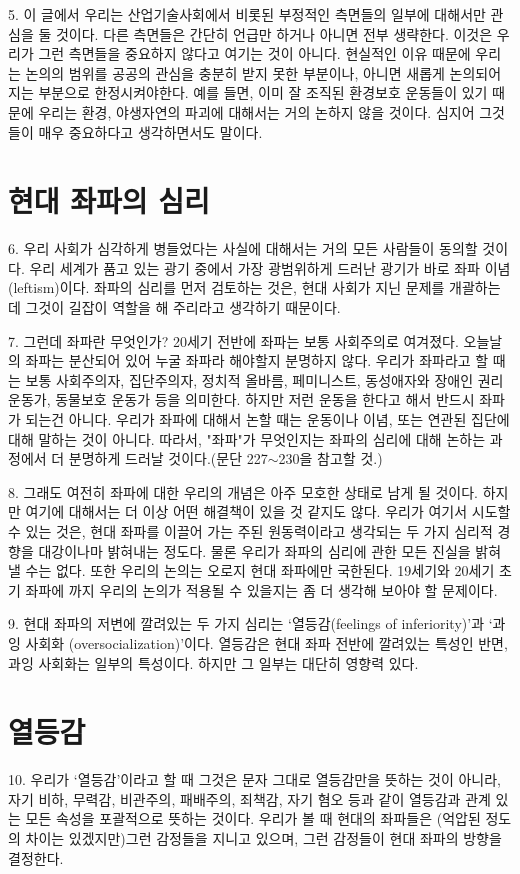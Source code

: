 \documentclass[11pt,a4paper]{article}
\begin{document}
\begin{multicols}{2}
5. 이 글에서 우리는 산업기술사회에서 비롯된 부정적인 측면들의 일부에 대해서만 관심을 둘 것이다.  다른 측면들은 간단히 언급만 하거나 아니면 전부 생략한다. 이것은 우리가 그런 측면들을 중요하지  않다고 여기는 것이 아니다. 현실적인 이유 때문에 우리는 논의의 범위를 공공의 관심을 충분히 받지 못한 부분이나, 아니면 새롭게 논의되어지는 부분으로 한정시켜야한다. 예를 들면, 이미 잘 조직된 환경보호 운동들이 있기 때문에 우리는 환경, 야생자연의 파괴에 대해서는 거의 논하지 않을 것이다. 심지어 그것들이 매우 중요하다고 생각하면서도 말이다. 


\section*{현대 좌파의 심리} 
6. 우리 사회가 심각하게 병들었다는 사실에 대해서는 거의 모든 사람들이 동의할 것이다. 우리 세계가  품고 있는 광기 중에서 가장 광범위하게 드러난 광기가 바로 좌파 이념(leftism)이다. 좌파의 심리를 먼저  검토하는 것은, 현대 사회가 지닌 문제를 개괄하는데 그것이 길잡이 역할을 해 주리라고 생각하기  때문이다.


7. 그런데 좌파란 무엇인가? 20세기 전반에 좌파는 보통 사회주의로 여겨졌다. 오늘날의 좌파는  분산되어 있어 누굴 좌파라 해야할지 분명하지 않다. 우리가 좌파라고 할 때는 보통 사회주의자,  집단주의자, 정치적 올바름, 페미니스트, 동성애자와 장애인 권리 운동가, 동물보호 운동가 등을  의미한다. 하지만 저런 운동을 한다고 해서 반드시 좌파가 되는건 아니다. 우리가 좌파에 대해서 논할  
때는 운동이나 이념, 또는 연관된 집단에 대해 말하는 것이 아니다. 따라서, "좌파"가 무엇인지는 좌파의  심리에 대해 논하는 과정에서 더 분명하게 드러날 것이다.(문단 227${\sim}$230을 참고할 것.)  


8. 그래도 여전히 좌파에 대한 우리의 개념은 아주 모호한 상태로 남게 될 것이다. 하지만 여기에  대해서는 더 이상 어떤 해결책이 있을 것 같지도 않다. 우리가 여기서 시도할 수 있는 것은, 현대 좌파를  이끌어 가는 주된 원동력이라고 생각되는 두 가지 심리적 경향을 대강이나마 밝혀내는 정도다. 물론 우리가 좌파의 심리에 관한 모든 진실을 밝혀 낼 수는 없다. 또한 우리의 논의는 오로지 현대 좌파에만  국한된다. 19세기와 20세기 초기 좌파에 까지 우리의 논의가 적용될 수 있을지는 좀 더 생각해 보아야 할 문제이다. 


9. 현대 좌파의 저변에 깔려있는 두 가지 심리는 `열등감(feelings of inferiority)'과 `과잉 사회화 (oversocialization)'이다. 열등감은 현대 좌파 전반에 깔려있는 특성인 반면, 과잉 사회화는 일부의  특성이다. 하지만 그 일부는 대단히 영향력 있다. 


\section*{열등감} 
10. 우리가 `열등감'이라고 할 때 그것은 문자 그대로 열등감만을 뜻하는 것이 아니라, 자기 비하, 무력감, 비관주의, 패배주의, 죄책감, 자기 혐오 등과 같이 열등감과 관계 있는 모든 속성을 포괄적으로 뜻하는  것이다. 우리가 볼 때 현대의 좌파들은 (억압된 정도의 차이는 있겠지만)그런 감정들을 지니고 있으며,  그런 감정들이 현대 좌파의 방향을 결정한다.  



\end{multicols}
\end{document}

